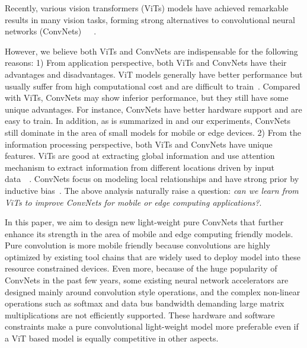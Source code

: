 \documentclass[10pt,twocolumn,letterpaper]{article}
\begin{document}
Recently, various vision transformers (ViTs) models have achieved remarkable results in many vision tasks, forming strong alternatives to convolutional neural networks (ConvNets)~\cite{dosovitskiy2020image}~\cite{touvron2021training}~\cite{liu2021swin}.

However, we believe both ViTs and ConvNets are indispensable for the following reasons:  1) From application perspective, both ViTs and ConvNets have their advantages and disadvantages. ViT models generally have better performance but usually suffer from high computational cost and are difficult to train~\cite{touvron2021training}. Compared with ViTs, ConvNets may show inferior performance, but they still have some unique advantages. For instance, ConvNets have better hardware support and are easy to train. In addition, as is summarized in \cite{guo2021cmt} and our experiments, ConvNets still dominate in the area of small models for mobile or edge devices. 2) From the information processing perspective, both ViTs and ConvNets have unique features. ViTs are good at extracting global information and use attention mechanism to extract information from different locations driven by input data~\cite{chen2021mobile}~\cite{mehta2022mobilevit}. ConvNets focus on modeling local relationships and have strong prior by inductive bias~\cite{dai2021coatnet}. The above analysis naturally raise a question: \emph{can we learn from ViTs to improve ConvNets for mobile or edge computing applications?}. 

In this paper, we aim to design new light-weight pure ConvNets that further enhance its strength in the area of mobile and edge computing friendly models. Pure convolution is more mobile friendly because convolutions are highly optimized by existing tool chains that are widely used to deploy model into these resource constrained devices. Even more, because of the huge popularity of ConvNets in the past few years, some existing neural network accelerators are designed mainly around convolution style operations, and the complex non-linear operations such as softmax and data bus bandwidth demanding large matrix multiplications are not efficiently supported. These hardware and software constraints make a pure convolutional light-weight model more preferable even if a ViT based model is equally competitive in other aspects.
\end{document}
